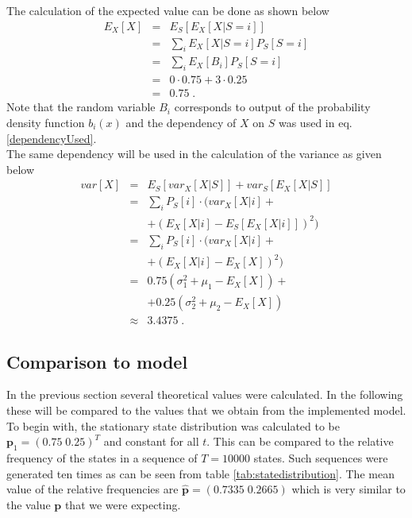 \documentclass[twocolumn, 10pt]{IEEEtran}
\begin{document}
The calculation of the expected value can be done as shown below
\begin{eqnarray}
	E_X[X] 	&=& E_S[E_X[X|S=i]] \label{dependencyUsed} \\
    		&=& \sum_i E_X[X|S=i] P_S[S=i] \\
            &=& \sum_i E_X[B_i] P_S[S=i] \\
            &=& 0\cdot 0.75 + 3 \cdot 0.25 \\
            &=& 0.75 \;.
\end{eqnarray}
Note that the random variable $B_i$ corresponds to output of the probability density function $b_i(x)$ and the dependency of $X$ on $S$ was used in eq. \eqref{dependencyUsed}.\\

The same dependency will be used in the calculation of the variance as given below
\begin{eqnarray}
	var[X] &=& E_S[var_X[X|S]] + var_S[E_X[X|S]] \\
    		&=& \sum_i P_S[i] \cdot ( var_X[X|i]  + \\ 
            && + (E_X[X|i] - E_S[E_X[X|i]])^2 ) \\
           &=& \sum_i P_S[i] \cdot ( var_X[X|i]  + \\ 
            && + (E_X[X|i] - E_X[X])^2 ) \\
            &=& 0.75 ( \sigma_1^2 + \mu_1 - E_X[X] ) + \\
            && + 0.25 (\sigma_2^2 + \mu_2 - E_X[X] ) \\
            &\approx& 3.4375 \;.
\end{eqnarray}

\subsection{Comparison to model}
In the previous section several theoretical values were calculated. In the following these will be compared to the values that we obtain from the implemented model.\\

To begin with, the stationary state distribution was calculated to be $\mathbf{p}_1 = (0.75 \; 0.25)^T$ and constant for all $t$. This can be compared to the relative frequency of the states in a sequence of $T=10000$ states. Such sequences were generated ten times as can be seen from table \ref{tab:statedistribution}. The mean value of the relative frequencies are $\hat{\mathbf{p}} = (0.7335 \; 0.2665)$ which is very similar to the value $\mathbf{p}$ that we were expecting. 
\end{document}
